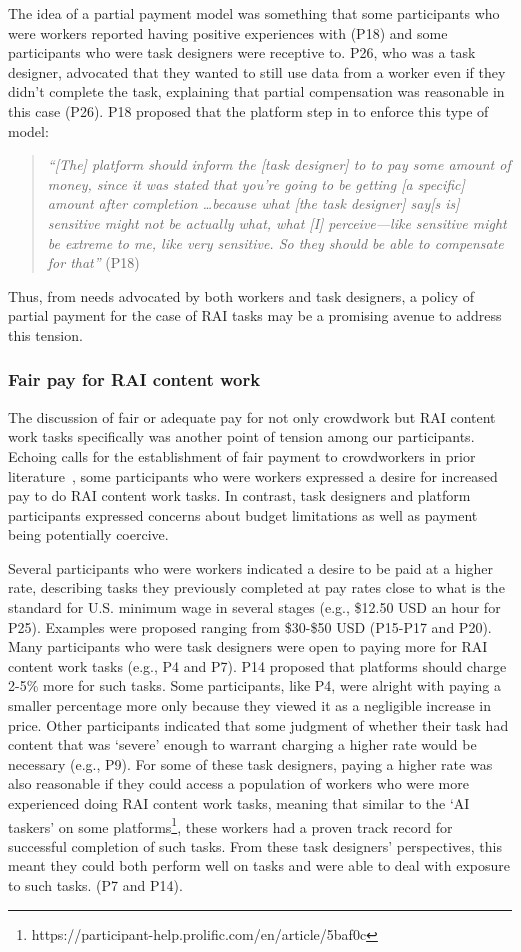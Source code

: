 The idea of a partial payment model was something that some participants who were workers reported having positive experiences with (P18) and some participants who were task designers were receptive to. P26, who was a task designer, advocated that they wanted to still use data from a worker even if they didn't complete the task, explaining that partial compensation was reasonable in this case (P26). P18 proposed that the platform step in to enforce this type of model:
\begin{quote}
    \textit{``[The] platform should inform the [task designer] to to pay some amount of money, since it was stated that you're going to be getting [a specific] amount after completion \dots  because what [the task designer] say[s is] sensitive might not be actually what, what [I] perceive---like sensitive might be extreme to me, like very sensitive. So they should be able to compensate for that''} (P18)
\end{quote}
Thus, from needs advocated by both workers and task designers, a policy of partial payment for the case of RAI tasks may be a promising avenue to address this tension. 

\subsubsection{Fair pay for RAI content work}
The discussion of fair or adequate pay for not only crowdwork but RAI content work tasks specifically was another point of tension among our participants. Echoing calls for the establishment of fair payment to crowdworkers in prior literature~\cite{silberman2018responsible, irani2013turkopticon}, some participants who were workers expressed a desire for increased pay to do RAI content work tasks. In contrast, task designers and platform participants expressed concerns about budget limitations as well as payment being potentially coercive. 

Several participants who were workers indicated a desire to be paid at a higher rate, describing tasks they previously completed at pay rates close to what is the standard for U.S. minimum wage in several stages (e.g., \$12.50 USD an hour for P25). Examples were proposed ranging from \$30-\$50 USD (P15-P17 and P20). Many participants who were task designers were open to paying more for RAI content work tasks (e.g., P4 and P7). P14 proposed that platforms should charge 2-5\% more for such tasks. Some participants, like P4, were alright with paying a smaller percentage more only because they viewed it as a negligible increase in price. Other participants indicated that some judgment of whether their task had content that was `severe' enough to warrant charging a higher rate would be necessary (e.g., P9). For some of these task designers, paying a higher rate was also reasonable if they could access a population of workers who were more experienced doing RAI content work tasks, meaning that similar to the `AI taskers' on some platforms\footnote{https://participant-help.prolific.com/en/article/5baf0c}, these workers had a proven track record for successful completion of such tasks. From these task designers' perspectives, this meant they could both perform well on tasks and were able to deal with exposure to such tasks. (P7 and P14). 

